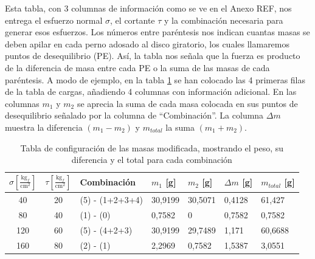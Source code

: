 Esta tabla, con 3 columnas de información como se ve en el Anexo REF, nos entrega el esfuerzo normal $\sigma$, el cortante $\tau$ y la combinación necesaria para generar esos esfuerzos. Los números entre paréntesis nos indican cuantas masas se deben apilar en cada perno adosado al disco giratorio, los cuales llamaremos puntos de desequilibrio (PE). Así, la tabla nos señala que la fuerza es producto de la diferencia de masa entre cada PE o la suma de las masas de cada paréntesis. A modo de ejemplo, en la tabla \ref{tab:ejemplo_config} se han colocado las 4 primeras filas de la tabla de cargas, añadiendo 4 columnas con información adicional. En las columnas $m_1$ y $m_2$ se aprecia la suma de cada masa colocada en sus puntos de desequilibrio señalado por la columna de ``Combinación''. La columna $\Delta m$ muestra la diferencia $(m_1-m_2)$ y $m_{total}$ la suma $(m_1+m_2)$. 

\begin{table}[h]
\centering
\label{tab:ejemplo_config}
\begin{tabular}{@{}cclllll@{}}
\toprule
$\sigma \left[\frac{\text{kg}_f}{\text{cm}^2}\right]$ & {$\tau \left[\frac{\text{kg}_f}{\text{cm}^2}\right]$} & Combinación     & $m_1$ {[}g{]} & $m_2$ {[}g{]} & $\Delta m$ {[}g{]} & $m_{total}$ {[}g{]} \\ \midrule
40                                                   & 20                                                                    & (5) - (1+2+3+4) & 30,9199       & 30,5071       & 0,4128             & 61,427              \\
80                                                   & 40                                                                    & (1) - (0)       & 0,7582        & 0             & 0,7582             & 0,7582              \\
120                                                  & 60                                                                    & (5) - (4+2+3)   & 30,9199       & 29,7489       & 1,171              & 60,6688             \\
160                                                  & 80                                                                    & (2) - (1)       & 2,2969        & 0,7582        & 1,5387             & 3,0551              \\ \bottomrule
\end{tabular}
\caption{Tabla de configuración de las masas modificada, mostrando el peso, su diferencia y el total para cada combinación}
\end{table}

